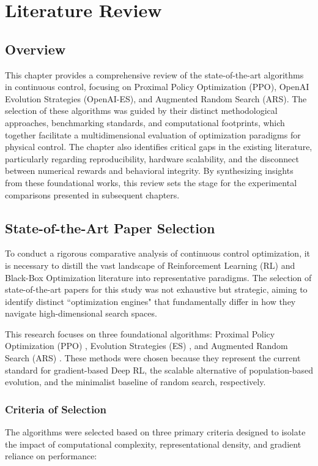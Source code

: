 %
%
\chapter{Literature Review}
\label{chap:literatureReview}
\setlength{\parskip}{1em}
%
\section{Overview}
This chapter provides a comprehensive review of the state-of-the-art algorithms in continuous control, focusing on Proximal Policy Optimization (PPO), OpenAI Evolution Strategies (OpenAI-ES), and Augmented Random Search (ARS). The selection of these algorithms was guided by their distinct methodological approaches, benchmarking standards, and computational footprints, which together facilitate a multidimensional evaluation of optimization paradigms for physical control. The chapter also identifies critical gaps in the existing literature, particularly regarding reproducibility, hardware scalability, and the disconnect between numerical rewards and behavioral integrity. By synthesizing insights from these foundational works, this review sets the stage for the experimental comparisons presented in subsequent chapters.

\section{State-of-the-Art Paper Selection}

To conduct a rigorous comparative analysis of continuous control optimization, it is necessary to distill the vast landscape of Reinforcement Learning (RL) and Black-Box Optimization literature into representative paradigms. The selection of state-of-the-art papers for this study was not exhaustive but strategic, aiming to identify distinct ``optimization engines" that fundamentally differ in how they navigate high-dimensional search spaces.

This research focuses on three foundational algorithms: Proximal Policy Optimization (PPO) \citep{schulman2017ppo}, Evolution Strategies (ES) \citep{salimans2017es}, and Augmented Random Search (ARS) \citep{mania2018randomsearch}. These methods were chosen because they represent the current standard for gradient-based Deep RL, the scalable alternative of population-based evolution, and the minimalist baseline of random search, respectively.

\subsection{Criteria of Selection}
The algorithms were selected based on three primary criteria designed to isolate the impact of computational complexity, representational density, and gradient reliance on performance:

